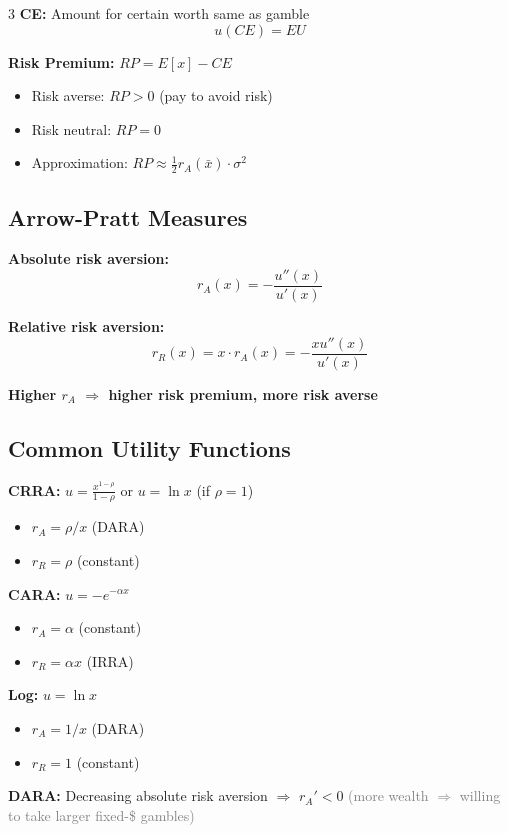 \documentclass[10pt,landscape]{article}
\newcommand{\note}[1]{\textcolor{gray}{\small(#1)}}
\begin{document}
\begin{multicols}{3}
\textbf{CE:} Amount for certain worth same as gamble
$$u(CE) = EU$$

\textbf{Risk Premium:} $RP = E[x] - CE$
\begin{itemize}[leftmargin=*,noitemsep]
\item Risk averse: $RP > 0$ (pay to avoid risk)
\item Risk neutral: $RP = 0$
\item Approximation: $RP \approx \frac{1}{2} r_A(\bar{x}) \cdot \sigma^2$
\end{itemize}

\subsection{Arrow-Pratt Measures}

\textbf{Absolute risk aversion:}
$$r_A(x) = -\frac{u''(x)}{u'(x)}$$

\textbf{Relative risk aversion:}
$$r_R(x) = x \cdot r_A(x) = -\frac{x u''(x)}{u'(x)}$$

\textbf{Higher $r_A$ $\Rightarrow$ higher risk premium, more risk averse}

\subsection{Common Utility Functions}

\textbf{CRRA:} $u = \frac{x^{1-\rho}}{1-\rho}$ or $u = \ln x$ (if $\rho = 1$)
\begin{itemize}[leftmargin=*,noitemsep]
\item $r_A = \rho/x$ (DARA)
\item $r_R = \rho$ (constant)
\end{itemize}

\textbf{CARA:} $u = -e^{-\alpha x}$
\begin{itemize}[leftmargin=*,noitemsep]
\item $r_A = \alpha$ (constant)
\item $r_R = \alpha x$ (IRRA)
\end{itemize}

\textbf{Log:} $u = \ln x$
\begin{itemize}[leftmargin=*,noitemsep]
\item $r_A = 1/x$ (DARA)
\item $r_R = 1$ (constant)
\end{itemize}

\textbf{DARA:} Decreasing absolute risk aversion $\Rightarrow$ $r_A' < 0$
\note{more wealth $\Rightarrow$ willing to take larger fixed-\$ gambles}


\end{multicols}
\end{document}
